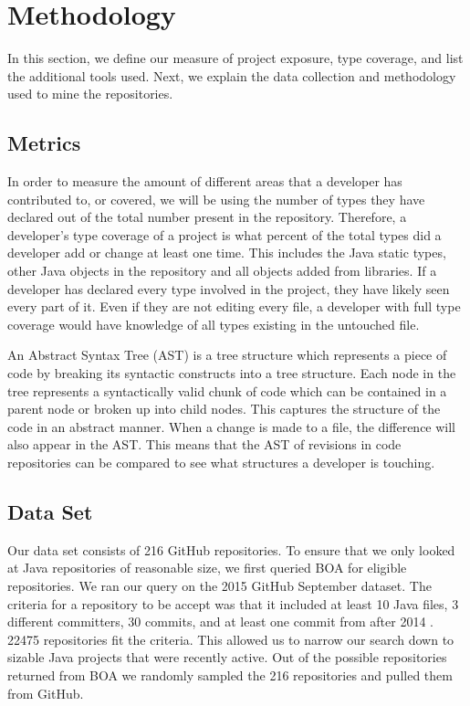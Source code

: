 \documentclass{sig-alternate-05-2015}
\begin{document}
\section{Methodology}
In this section, we define our measure of project exposure, type coverage, and list the additional tools used. Next, we explain the data collection and methodology used to mine the repositories.

\subsection{Metrics}
In order to measure the amount of different areas that a developer has contributed to, or covered, we will be using the number of types they have declared out of the total number present in the repository. Therefore, a developer's type coverage of a project is what percent of the total types did a developer add or change at least one time. This includes the Java static types, other Java objects in the repository and all objects added from libraries. If a developer has declared every type involved in the project, they have likely seen every part of it. Even if they are not editing every file, a developer with full type coverage would have knowledge of all types existing in the untouched file. 

An Abstract Syntax Tree (AST) is a tree structure which represents a piece of code by breaking its syntactic constructs into a tree structure. Each node in the tree represents a syntactically valid chunk of code which can be contained in a parent node or broken up into child nodes. This captures the structure of the code in an abstract manner. When a change is made to a file, the difference will also appear in the AST. This means that the AST of revisions in code repositories can be compared to see what structures a developer is touching. 

\subsection{Data Set}
Our data set consists of 216 GitHub repositories. To ensure that we only looked at Java repositories of reasonable size, we first queried BOA \cite{Dyer-Nguyen-Rajan-Nguyen-13} for eligible repositories. We ran our query on the 2015 GitHub September dataset. The criteria for a repository to be accept was that it included at least 10 Java files, 3 different committers, 30 commits, and at least one commit from after 2014 \cite{Kalliamvakou:2014:PPM:2597073.2597074}. 22475 repositories fit the criteria. This allowed us to narrow our search down to sizable Java projects that were recently active. Out of the possible repositories returned from BOA we randomly sampled the 216 repositories and pulled them from GitHub.
\end{document}
